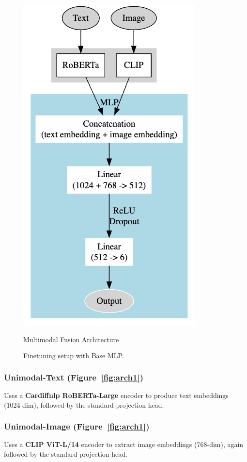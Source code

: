 \begin{figure}[ht]
\begin{minipage}{0.49\textwidth}
        \includegraphics[height=0.5\textheight]{images/multimodal.png}
        \caption{Multimodal Fusion Architecture}
        \label{fig:arch2}
    \end{minipage}
    \caption{Finetuning setup with Base MLP.}
    \label{fig:architecture}
\end{figure}

\subsubsection*{Unimodal-Text (Figure~\ref{fig:arch1})}
Uses a \textbf{Cardiffnlp RoBERTa-Large} encoder to produce text embeddings (1024-dim), followed by the standard projection head.

\subsubsection*{Unimodal-Image (Figure~\ref{fig:arch1})}
Uses a \textbf{CLIP ViT-L/14} encoder to extract image embeddings (768-dim), again followed by the standard projection head.

